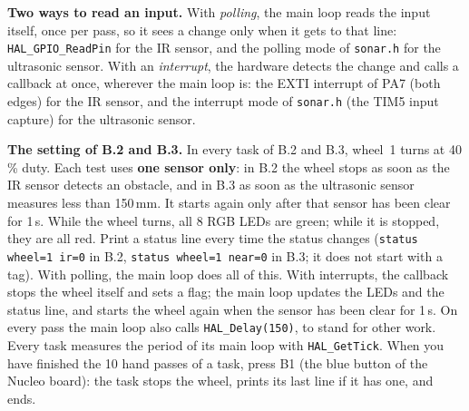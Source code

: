 \documentclass[11pt,a4paper]{article}
\begin{document}
\smallskip\noindent
\textbf{Two ways to read an input.} With \emph{polling}, the main loop reads the input itself, once per pass, so it
sees a change only when it gets to that line: \texttt{HAL\_GPIO\_ReadPin} for the IR sensor, and the polling mode of
\texttt{sonar.h} for the ultrasonic sensor. With an \emph{interrupt}, the hardware detects the change and calls a
callback at once, wherever the main loop is: the EXTI interrupt of PA7 (both edges) for the IR sensor, and the
interrupt mode of \texttt{sonar.h} (the TIM5 input capture) for the ultrasonic sensor.

\smallskip\noindent
\textbf{The setting of B.2 and B.3.} In every task of B.2 and B.3, wheel~1 turns at 40\,\% duty. Each test uses \textbf{one sensor only}: in B.2 the wheel stops as soon as the IR sensor detects an obstacle,
and in B.3 as soon as the ultrasonic sensor measures less than 150\,mm. It starts again only after that sensor has
been clear for 1\,s. While the wheel turns, all 8 RGB LEDs are green; while it is stopped, they are
all red. Print a status line every time the status changes (\texttt{status wheel=1 ir=0} in B.2,
\texttt{status wheel=1 near=0} in B.3; it does not start with a tag). With polling, the main loop does all of this. With interrupts, the callback stops the wheel
itself and sets a flag; the main loop updates the LEDs and the status line, and starts the wheel again when
the sensor has been clear for 1\,s. On every pass the main loop also calls \texttt{HAL\_Delay(150)}, to stand for
other work. Every task measures the period of its main loop with \texttt{HAL\_GetTick}. When you have finished the
10 hand passes of a task, press B1 (the blue button of the Nucleo board): the task stops the wheel, prints its last
line if it has one, and ends.
\end{document}

